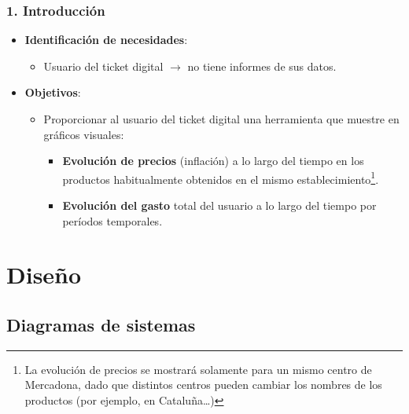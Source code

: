 \documentclass{beamer}
\begin{document}
\begin{frame}
	\frametitle{1. Introducción}
	\begin{itemize}
		\item \textbf{Identificación de necesidades}:
		\begin{itemize}
			\item Usuario del ticket digital $\rightarrow$ no tiene informes de sus datos.
		\end{itemize}
		
		\item \textbf{Objetivos}:
		\begin{itemize}
			\item Proporcionar al usuario del ticket digital una herramienta que muestre en gráficos visuales:
			\begin{itemize}
				\item \textbf{Evolución de precios} (inflación) a lo largo del tiempo en los productos habitualmente obtenidos en el mismo establecimiento\footnote{La evolución de precios se mostrará solamente para un mismo centro de Mercadona, dado que distintos centros pueden cambiar los nombres de los productos (por ejemplo, en Cataluña…)}.
				\item \textbf{Evolución del gasto} total del usuario a lo largo del tiempo por períodos temporales.
			\end{itemize}
		\end{itemize}
	\end{itemize}
\end{frame}

			
			

	
	
	
	
	
	\section{Diseño}
	
	
		
			\subsection{Diagramas de sistemas}
		
\end{document}
